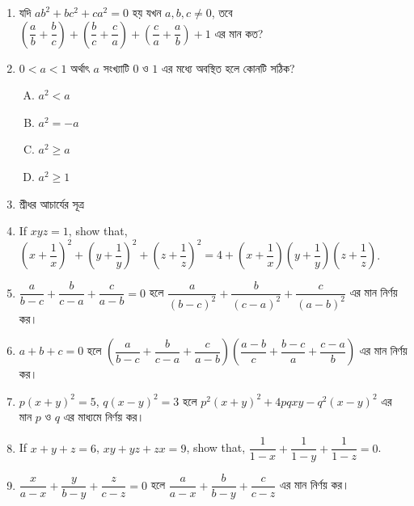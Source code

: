 \documentclass[11pt, a4paper]{article}
\begin{document}
\begin{enumerate}


	\item \textbengali{যদি} 
	$ ab^2 + bc^2 + ca^2 = 0 $
	\textbengali{হয়  যখন} $ a,b,c \neq 0 $, 
	\textbengali{তবে} $ \left( \dfrac{a}{b} + \dfrac{b}{c} \right) + \left( \dfrac{b}{c} + \dfrac{c}{a} \right) + \left( \dfrac{c}{a} + \dfrac{a}{b} \right) +1 $
	\textbengali{এর মান কত?}

	\item $ 0<a<1 $ \textbengali{অর্থাৎ} $a$ \textbengali{সংখ্যাটি} $0$ \textbengali{ও} $1$ \textbengali{এর মধ্যে অবস্থিত হলে কোনটি সঠিক?}  \begin{enumerate}[A.]
	\item $a^2 < a$
	\item $a^2 = -a$
	\item $a^2 \geq a$
	\item $a^2 \geq 1$
	\end{enumerate}
	
	\item \textbengali{শ্রীধর আচার্যের সূত্র}
	
	\item If $ xyz = 1 $, show that, $ \left( x + \dfrac{1}{x} \right)^2 + \left( y + \dfrac{1}{y} \right)^2 + \left( z + \dfrac{1}{z} \right)^2 = 4 + \left( x + \dfrac{1}{x} \right) \left( y + \dfrac{1}{y} \right) \left( z + \dfrac{1}{z} \right) $.
	
	\item $ \dfrac{a}{b-c} + \dfrac{b}{c-a} + \dfrac{c}{a-b} = 0 $ \textbengali{হলে} $ \dfrac{a}{(b-c)^2} + \dfrac{b}{(c-a)^2} + \dfrac{c}{(a-b)^2} $ \textbengali{এর মান নির্ণয় কর।}
	
	\item $ a + b + c = 0 $ \textbengali{হলে} $ \left( \dfrac{a}{b-c} + \dfrac{b}{c-a} + \dfrac{c}{a-b} \right) \left( \dfrac{a-b}{c} + \dfrac{b-c}{a} + \dfrac{c-a}{b} \right) $ \textbengali{এর মান নির্ণয় কর।}
	
	\item $ p(x+y)^2 = 5 $, $ q(x-y)^2 = 3 $ \textbengali{হলে} $ p^2(x+y)^2 + 4pqxy - q^2(x-y)^2  $ \textbengali{এর মান} $p$ \textbengali{ও} $q$ \textbengali{এর মাধ্যমে নির্ণয় কর।}
	
	\item If $ x+y+z = 6 $, $ xy + yz + zx = 9 $, show that, $ \dfrac{1}{1-x} + \dfrac{1}{1-y} + \dfrac{1}{1-z} = 0 $.
	
	\item $ \dfrac{x}{a-x} + \dfrac{y}{b-y} + \dfrac{z}{c-z} = 0 $ \textbengali{হলে} $ \dfrac{a}{a-x} + \dfrac{b}{b-y} + \dfrac{c}{c-z}  $ \textbengali{এর মান নির্ণয় কর।}
	

\end{enumerate}
\end{document}
